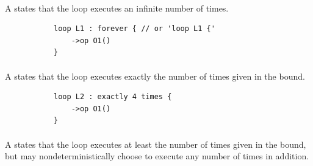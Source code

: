\paragraph{\minfiniteloopbound}
A \minfiniteloopbound{} states that the loop executes an infinite
number of times.

\begin{figure}[H]
\begin{subfigure}[t]{\egtextwidth}
\begin{lstlisting}[style=Example]
loop L1 : forever { // or 'loop L1 {'
    ->op O1()
}
\end{lstlisting}
\end{subfigure}
\hfill
\begin{subfigure}[t]{\eggraphicalwidth}
  \gsecaption
  \centering
\end{subfigure}
\end{figure}

\paragraph{\mdefiniteloopbound}
A \mdefiniteloopbound{} states that the loop executes exactly the
number of times given in the bound.

\begin{figure}[H]
\begin{subfigure}[t]{\egtextwidth}
\begin{lstlisting}[style=Example]
loop L2 : exactly 4 times {
    ->op O1()
}
\end{lstlisting}
\end{subfigure}
\hfill
\begin{subfigure}[t]{\eggraphicalwidth}
  \gsecaption
  \centering
\end{subfigure}
\end{figure}

\paragraph{\mlowerloopbound}
A \mlowerloopbound{} states that the loop executes at least the
number of times given in the bound, but may nondeterministically
choose to execute any number of times in addition.

